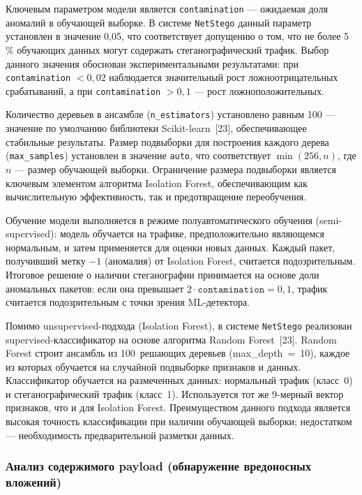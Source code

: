 Ключевым параметром модели является \texttt{contamination} --- ожидаемая доля аномалий в обучающей выборке. В системе \texttt{NetStego} данный параметр установлен в значение 0{,}05, что соответствует допущению о том, что не более 5\,\% обучающих данных могут содержать стеганографический трафик. Выбор данного значения обоснован экспериментальными результатами: при \texttt{contamination} $< 0{,}02$ наблюдается значительный рост ложноотрицательных срабатываний, а при \texttt{contamination} $> 0{,}1$ --- рост ложноположительных.

Количество деревьев в ансамбле (\texttt{n\_estimators}) установлено равным 100 --- значение по умолчанию библиотеки Scikit-learn~[23], обеспечивающее стабильные результаты. Размер подвыборки для построения каждого дерева (\texttt{max\_samples}) установлен в значение \texttt{auto}, что соответствует $\min(256, n)$, где $n$ --- размер обучающей выборки. Ограничение размера подвыборки является ключевым элементом алгоритма Isolation Forest, обеспечивающим как вычислительную эффективность, так и предотвращение переобучения.

Обучение модели выполняется в режиме полуавтоматического обучения (semi-supervised): модель обучается на трафике, предположительно являющемся нормальным, и затем применяется для оценки новых данных. Каждый пакет, получивший метку $-1$ (аномалия) от Isolation Forest, считается подозрительным. Итоговое решение о наличии стеганографии принимается на основе доли аномальных пакетов: если она превышает $2 \cdot \texttt{contamination} = 0{,}1$, трафик считается подозрительным с точки зрения ML-детектора.

Помимо unsupervised-подхода (Isolation Forest), в системе \texttt{NetStego} реализован supervised-классификатор на основе алгоритма Random Forest~[23]. Random Forest строит ансамбль из 100~решающих деревьев (max\_depth~=~10), каждое из которых обучается на случайной подвыборке признаков и данных. Классификатор обучается на размеченных данных: нормальный трафик (класс~0) и стеганографический трафик (класс~1). Используется тот же 9-мерный вектор признаков, что и для Isolation Forest. Преимуществом данного подхода является высокая точность классификации при наличии обучающей выборки; недостатком --- необходимость предварительной разметки данных.

\subsubsection{Анализ содержимого payload (обнаружение вредоносных вложений)}

